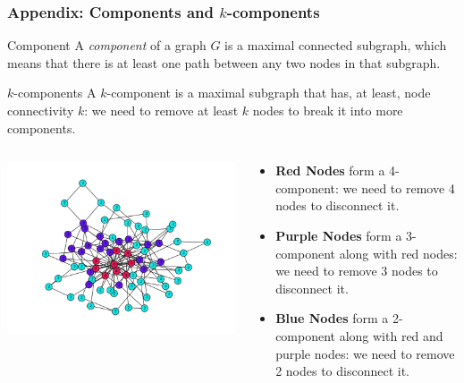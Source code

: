 \documentclass[ignorenonframetext,red,8pt,notes=hide]{beamer}
\begin{document}
\begin{frame}
\frametitle{Appendix: Components and $k$-components}

\begin{block}{Component}
A \emph{component} of a graph $G$ is a maximal connected subgraph, which means that there is at least one path between any two nodes in that subgraph.
\end{block}

\begin{block}{$k$-components}
A $k$-component is a maximal subgraph that has, at least, node connectivity $k$: we need to remove at least $k$ nodes to break it into more components. 
\end{block}

\begin{columns}[c]
\begin{column}{0.4\textwidth}
\begin{center}
\includegraphics[scale=0.25]{img/knum_colors}
\end{center}
\end{column}

\begin{column}{0.6\textwidth}
\begin{itemize}
\item \textbf{Red Nodes} form a 4-component: we need to remove 4 nodes to disconnect it.
\item \textbf{Purple Nodes} form a 3-component along with red nodes: we need to remove 3 nodes to disconnect it.
\item \textbf{Blue Nodes} form a 2-component along with red and purple nodes: we need to remove 2 nodes to disconnect it. 
\end{itemize}
\end{column}
\end{columns}

\end{frame}
\end{document}
